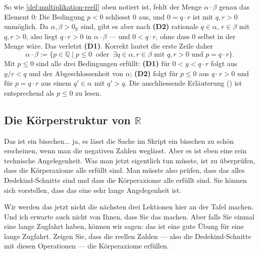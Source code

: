 \begin{ai-note}
So wie \cref{def:multiplikation-reell} oben notiert ist, fehlt der Menge $\alpha \cdot \beta$ genau das Element $0$: Die Bedingung $p < 0$ schliesst $0$ aus, und $0 = q \cdot r$ ist mit $q, r > 0$ unmöglich. Da $\alpha, \beta > 0_{\mathbb{R}}$ sind, gibt es aber nach \textbf{(D2)} rationale $q \in \alpha$, $r \in \beta$ mit $q, r > 0$, also liegt $q \cdot r > 0$ in $\alpha \cdot \beta$ --- und $0 < q \cdot r$, ohne dass $0$ selbst in der Menge wäre. Das verletzt \textbf{(D1)}. Korrekt lautet die erste Zeile daher
\[ \alpha \cdot \beta := \{ p \in \mathbb{Q} \mid p \le 0 \ \text{ oder } \ \exists q \in \alpha, r \in \beta \text{ mit } q, r > 0 \text{ und } p = q \cdot r \}. \]
Mit $p \le 0$ sind alle drei Bedingungen erfüllt: \textbf{(D1)} für $0 < y < q \cdot r$ folgt aus $y/r < q$ und der Abgeschlossenheit von $\alpha$; \textbf{(D2)} folgt für $p \le 0$ aus $q \cdot r > 0$ und für $p = q \cdot r$ aus einem $q' \in \alpha$ mit $q' > q$. Die anschliessende Erläuterung () ist entsprechend als $p \le 0$ zu lesen.
\end{ai-note}

\subsection{Die Körperstruktur von \texorpdfstring{$\mathbb{R}$}{R}}

\begin{spoken-clean}[01:10:00 - 01:12:45]
Das ist ein bisschen... ja, es lässt die Sache im Skript ein bisschen zu schön erscheinen, wenn man die negativen Zahlen weglässt. Aber es ist eben eine rein technische Angelegenheit. Was man jetzt eigentlich tun müsste, ist zu überprüfen, dass die Körperaxiome alle erfüllt sind. Man müsste also prüfen, dass das alles Dedekind-Schnitte sind und dass die Körperaxiome alle erfüllt sind. Sie können sich vorstellen, dass das eine sehr lange Angelegenheit ist.

Wir werden das jetzt nicht die nächsten drei Lektionen hier an der Tafel machen. Und ich erwarte auch nicht von Ihnen, dass Sie das machen. Aber falls Sie einmal eine lange Zugfahrt haben, können wir sagen: das ist eine gute Übung für eine lange Zugfahrt. Zeigen Sie, dass die reellen Zahlen --- also die Dedekind-Schnitte mit diesen Operationen --- die Körperaxiome erfüllen.
\end{spoken-clean}

